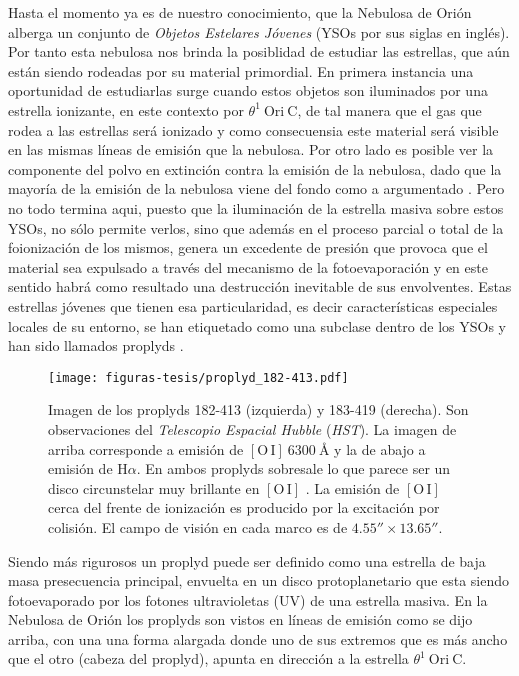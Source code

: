 \documentclass{article}
\newcommand\ha{\ensuremath{\mathrm{H}\alpha}}
\begin{document}
Hasta el momento ya es de nuestro conocimiento, que la Nebulosa de Orión alberga un conjunto de \textit{Objetos Estelares Jóvenes} (YSOs por sus siglas en inglés). Por tanto esta nebulosa nos brinda la posiblidad de estudiar las estrellas, que aún están siendo rodeadas por su material primordial. En primera instancia una oportunidad de estudiarlas surge cuando estos objetos son iluminados por una estrella ionizante, en este contexto  por \(\theta^1\ \text{Ori}\ \text{C}\), de tal manera que el gas que rodea a las estrellas será ionizado y como consecuensia este material será visible en las mismas líneas de emisión que la nebulosa. Por otro lado es posible ver la componente del polvo en extinción contra la emisión de la nebulosa, dado que la mayoría de la emisión de la nebulosa viene del fondo como a argumentado \citet{Odell:2008}. Pero no todo termina aqui, puesto que la iluminación de la estrella masiva sobre estos YSOs, no sólo permite verlos, sino que además en el proceso parcial o total de la foionización de los mismos, genera un excedente de presión que provoca que el material sea expulsado a través del mecanismo de la fotoevaporación y en este sentido habrá como resultado una destrucción inevitable de sus envolventes. Estas estrellas jóvenes que tienen esa particularidad, es decir características especiales locales de su entorno, se han etiquetado como una subclase dentro de los YSOs y han sido llamados proplyds \citep{Odell:1994}.\\

\begin{figure}
  \centering
  \texttt{[image: figuras-tesis/proplyd\_182-413.pdf]}
  \caption{Imagen de los proplyds 182-413 (izquierda) y 183-419 (derecha). Son observaciones del \textit{Telescopio Espacial Hubble} (\textit{HST}). La imagen de arriba corresponde a emisión de \(\mathrm{[O\,I]}~6300~\text{\AA{}}\)  y la de abajo a emisión de \(\ha\). En ambos proplyds sobresale lo que parece ser un disco circunstelar muy brillante en  \(\mathrm{[O\,I]}\) \citep{Bally:2000a}. La emisión de \(\mathrm{[O\,I]}\) cerca del frente de ionización es producido por la excitación por colisión. El campo de visión en cada marco es de \(4.55'' \times 13.65''\).}
  \label{fig:182-413}
\end{figure}
  

Siendo más rigurosos un proplyd puede ser definido como una estrella de baja masa presecuencia principal, envuelta en un  disco protoplanetario que esta siendo fotoevaporado por los fotones ultravioletas (UV) de una estrella masiva. En la Nebulosa de Orión los proplyds son vistos en líneas de emisión como se dijo arriba, con una una forma alargada donde uno de sus extremos que es más ancho que el otro (cabeza del proplyd), apunta en dirección a la estrella  \(\theta^1\ \text{Ori}\ \text{C}\). 
\end{document}
